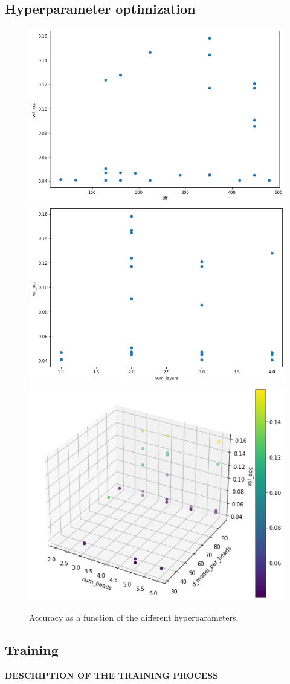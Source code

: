\documentclass[journal]{IEEEtai}
\begin{document}
\subsection{Hyperparameter optimization}
\begin{figure}
	\centering
  \includegraphics[width=0.45\linewidth]{fig/hp_dff.png}
  \includegraphics[width=0.45\linewidth]{fig/hp_num_layers.png}
  \includegraphics[width=0.5\linewidth]{fig/hp_num_heads_d_model.png}
  \caption{Accuracy as a function of the different hyperparameters.}
  \label{fig:hp}
\end{figure}

\subsection{Training}
\textbf{DESCRIPTION OF THE TRAINING PROCESS}
\end{document}
